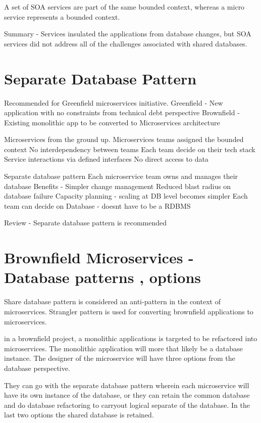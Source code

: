 \documentclass[a4paper, 11pt]{book}
\begin{document}
    A set of SOA services are part of the same bounded context, whereas a micro service represents a bounded context.

    Summary
    - Services insulated the applications from database changes, but SOA services did not address all of the challenges associated with shared databases.


    \section{Separate Database Pattern}
    Recommended for Greenfield microservices initiative.
    Greenfield - New application with no constraints from technical debt perspective
    Brownfield - Existing monolithic app to be converted to Microservices architecture

    Microservices from the ground up.
    Microservices teams assigned the bounded context
    No interdependency between teams
    Each team decide on their tech stack
    Service interactions via defined interfaces
    No direct access to data

    Separate database pattern
    Each microservice team owns and manages their database
    Benefits - Simpler change management
    Reduced blast radius on database failure
    Capacity planning - scaling at DB level becomes simpler
    Each team can decide on Database - doesnt have to be a RDBMS

    Review
    - Separate database pattern is recommended


    \section{Brownfield Microservices - Database patterns , options}
    Share database pattern is considered an anti-pattern in the context of microservices.
    Strangler pattern is used for converting brownfield applications to microservices.

    in a brownfield project, a monolithic applications is targeted to be refactored into microservices.
    The monolithic application will more that likely be a database instance.
    The designer of the microservice will have three options from the database perspective.

    They can go with the separate database pattern wherein each microservice will have its own instance of the database, or they can retain the common database and do database refactoring to carryout logical separate of the database.
    In the last two options the shared database is retained.
\end{document}
